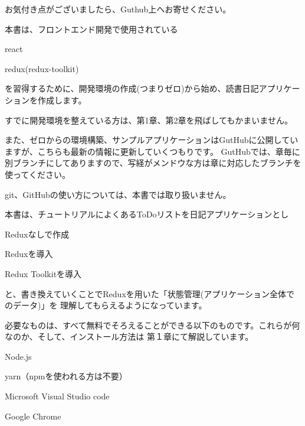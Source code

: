 お気付き点がございましたら、Guthub上へお寄せください。

\vspace*{\baselineskip}

本書は、フロントエンド開発で使用されている

\begin{starteritemize}
\item react
\item redux(redux{-}toolkit)
\end{starteritemize}

を習得するために、開発環境の作成(つまりゼロ)から始め、読書日記アプリケーションを作成します。

\vspace*{\baselineskip}

すでに開発環境を整えている方は、第1章、第2章を飛ばしてもかまいません。

\vspace*{\baselineskip}

また、ゼロからの環境構築、サンプルアプリケーションはGutHubに公開していますが、こちらも最新の情報に更新していくつもりです。
GutHubでは、章毎に別ブランチにしてありますので、写経がメンドウな方は章に対応したブランチを使ってください。

\vspace*{\baselineskip}

git、GitHubの使い方については、本書では取り扱いません。

\vspace*{\baselineskip}

本書は、チュートリアルによくあるToDoリストを日記アプリケーションとし

\begin{starterenumerate}
\item Reduxなしで作成
\item Reduxを導入
\item Redux Toolkitを導入
\end{starterenumerate}

と、書き換えていくことでReduxを用いた「状態管理(アプリケーション全体でのデータ)」を
理解してもらえるようになっています。

\vspace*{\baselineskip}

必要なものは、すべて無料でそろえることができる以下のものです。これらが何なのか、そして、インストール方法は
第１章にて解説しています。

\begin{starteritemize}
\item Node.js
\item yarn（npmを使われる方は不要）
\item Microsoft Visual Studio code
\item Google Chrome
\end{starteritemize}

